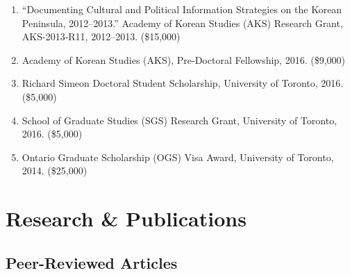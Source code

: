\documentclass[11pt, a4paper]{article}
\begin{document}
\begin{enumerate}[itemsep=0.15em]
  \item ``Documenting Cultural and Political Information Strategies on the Korean Peninsula, 2012--2013.'' Academy of Korean Studies (AKS) Research Grant, AKS-2013-R11, 2012--2013. (\$15,000)\dag

  \item Academy of Korean Studies (AKS), Pre-Doctoral Fellowship, 2016. (\$9,000)

  \item Richard Simeon Doctoral Student Scholarship, University of Toronto, 2016. (\$5,000)

  \item School of Graduate Studies (SGS) Research Grant, University of Toronto, 2016. (\$5,000)

  \item Ontario Graduate Scholarship (OGS) Visa Award, University of Toronto, 2014. (\$25,000)
\end{enumerate}

\section{Research \& Publications}

\subsection{Peer-Reviewed Articles}
\end{document}
